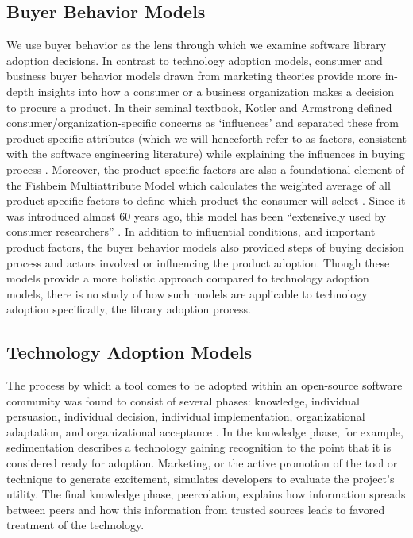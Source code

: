 \subsection{Buyer Behavior Models}
\label{sec:buyer-model}
We use buyer behavior as the lens through which we examine software library adoption decisions.
In contrast to technology adoption models, consumer and business buyer behavior models drawn from marketing theories provide more in-depth insights into how a consumer or a business organization makes a decision to procure a product. In their seminal textbook, Kotler and Armstrong defined consumer/organization-specific concerns as `influences' and  separated these from product-specific attributes (which we will henceforth refer to as factors, consistent with the software engineering literature) while explaining the influences in buying process \cite{kotler2014principles}. Moreover, the product-specific factors are also a foundational element of the Fishbein Multiattribute Model which calculates the weighted average of all product-specific factors to define which product the consumer will select \cite{fishbein1967attitude}. Since it was introduced almost 60 years ago, this model has been ``extensively used by consumer researchers'' \cite{blackwell2001consumer}. %
In addition to influential conditions, and important product factors, the buyer behavior models also provided steps of buying decision process and actors involved or influencing the product adoption. Though these models provide a more holistic approach compared to technology adoption models, there is no study of how such models are applicable to technology adoption specifically, the library adoption process.


\subsection{Technology Adoption Models} %
\label{sec:tech-adoption}
The process by which a tool comes to be adopted within an open-source software community was found to consist of several phases: knowledge, individual persuasion, individual decision, individual implementation, organizational adaptation, and organizational acceptance \cite{krafft:2016:free}. In the knowledge phase, for example, sedimentation describes a technology gaining recognition to the point that it is considered ready for adoption. Marketing, or the active promotion of the tool or technique to generate excitement, simulates developers to evaluate the project's utility. The final knowledge phase, peercolation, explains how information spreads between peers and how this information from trusted sources leads to favored treatment of the technology.


